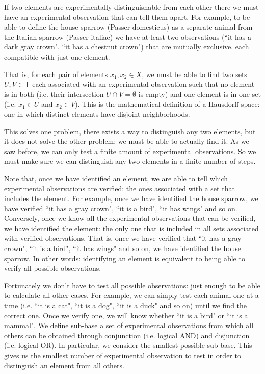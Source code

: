 \documentclass[11pt,letterpaper,fleqn]{memoir} %
\begin{document}
If two elements are experimentally distinguishable from each other there we must have an experimental observation that can tell them apart. For example, to be able to define the house sparrow (Passer domesticus) as a separate animal from the Italian sparrow (Passer italiae) we have at least two observations (``it has a dark gray crown", ``it has a chestnut crown") that are mutually exclusive, each compatible with just one element.

That is, for each pair of elements $x_1, x_2 \in X$, we must be able to find two sets $U,V \in \mathsf{T}$ each associated with an experimental observation such that no element is in both (i.e. their intersection $U \cap V=\emptyset$ is empty) and one element is in one set (i.e. $x_1 \in U$ and $x_2 \in V$). This is the mathematical definition of a Hausdorff space: one in which distinct elements have disjoint neighborhoods. 

This solves one problem, there exists a way to distinguish any two elements, but it does not solve the other problem: we must be able to actually find it. As we saw before, we can only test a finite amount of experimental observations. So we must make sure we can distinguish any two elements in a finite number of steps.

Note that, once we have identified an element, we are able to tell which experimental observations are verified: the ones associated with a set that includes the element. For example, once we have identified the house sparrow, we have verified ``it has a gray crown", ``it is a bird", ``it has wings" and so on. Conversely, once we know all the experimental observations that can be verified, we have identified the element: the only one that is included in all sets associated with verified observations. That is, once we have verified that ``it has a gray crown", ``it is a bird", ``it has wings" and so on, we have identified the house sparrow. In other words: identifying an element is equivalent to being able to verify all possible observations.

Fortunately we don't have to test all possible observations: just enough to be able to calculate all other cases. For example, we can simply test each animal one at a time (i.e. ``it is a cat", ``it is a dog", ``it is a duck" and so on) until we find the correct one. Once we verify one, we will know whether ``it is a bird" or ``it is a mammal". We define sub-base a set of experimental observations from which all others can be obtained through conjunction (i.e. logical AND) and disjunction (i.e. logical OR). In particular, we consider the smallest possible sub-base. This gives us the smallest number of experimental observation to test in order to distinguish an element from all others.
\end{document}
